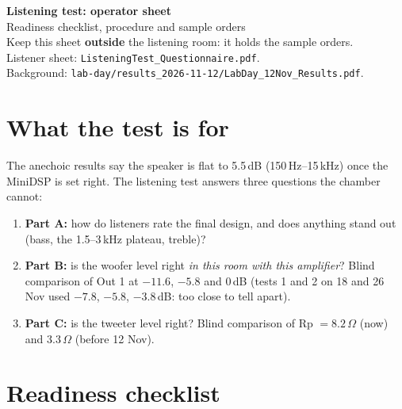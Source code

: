 \documentclass[11pt,a4paper]{article}
\begin{document}
{\LARGE\bfseries Listening test: operator sheet}\\[2pt]
{\large Readiness checklist, procedure and sample orders}\\[2pt]
{\small Keep this sheet \textbf{outside} the listening room: it holds the sample orders.\\
Listener sheet: \texttt{ListeningTest\_Questionnaire.pdf}.\\
Background: \texttt{lab-day/results\_2026-11-12/LabDay\_12Nov\_Results.pdf}.}

\section*{What the test is for}
The anechoic results say the speaker is flat to 5.5\,dB (150\,Hz--15\,kHz) once the MiniDSP is set right.
The listening test answers three questions the chamber cannot:
\begin{enumerate}[itemsep=0pt]
\item \textbf{Part A:} how do listeners rate the final design, and does anything stand out (bass, the 1.5--3\,kHz plateau, treble)?
\item \textbf{Part B:} is the woofer level right \emph{in this room with this amplifier}? Blind comparison of Out 1 at $-11.6$, $-5.8$ and $0$\,dB (tests 1 and 2 on 18 and 26 Nov used $-7.8$, $-5.8$, $-3.8$\,dB: too close to tell apart).
\item \textbf{Part C:} is the tweeter level right? Blind comparison of Rp $=8.2\,\Omega$ (now) and $3.3\,\Omega$ (before 12 Nov).
\end{enumerate}

\section{Readiness checklist}
\end{document}
